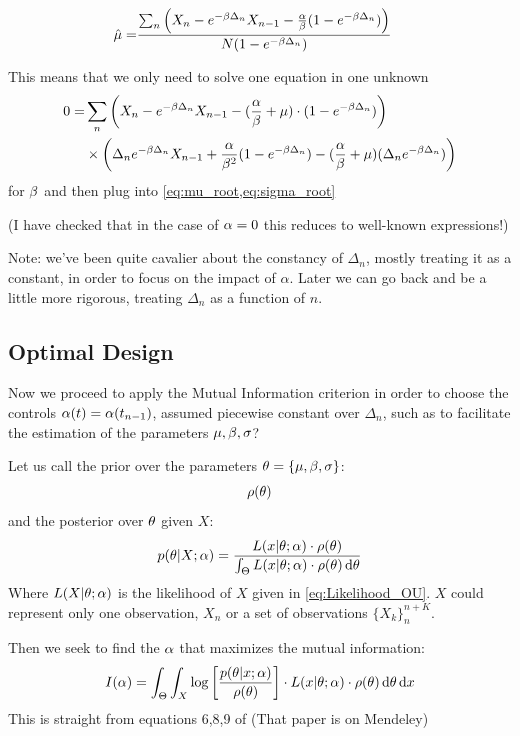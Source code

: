 \begin{align}
\hat{{\mu }} =&  \frac{ \sum_n \left( X_n - e^{-\beta \Delta_n} X_{n-1} -
	\frac{\alpha}{\beta} ( 1-e^{-\beta \Delta_n}) \right)}
	{N ( 1-e^{-\beta \Delta_n})}
	\label{eq:mu_root}
\end{align}

This means that we only need to solve one equation in one unknown
\begin{align}
\label{eq:beta_root}
0=& \sum_n \left( X_n - e^{-\beta \Delta_n} X_{n-1} -
  (\frac {{\alpha}}{{\beta}} + {\mu }) \cdot ( 1-e^{-\beta \Delta_n})  \right) 
  \\ \notag 
  & \times \left( \Delta_n e^{- \beta \Delta_n}X_{n-1} 
  							  + \frac{ \alpha } {\beta^2} (1-e^{-\beta \Delta_n}) 
  					 		  - (\frac {{\alpha}}{{\beta}} + {\mu }) ( \Delta_n e^{- \beta \Delta_n})          
  					 		  \right)
\end{align}
for $\beta$ and then plug into \cref{eq:mu_root,eq:sigma_root}

(I have checked that in the case of $\alpha=0$ this reduces to well-known
expressions!)

Note: we've been quite cavalier about the constancy of $\Delta_n$, mostly
treating it as a constant, in order to focus on the impact of $\alpha$. Later we
can go back and be a little more rigorous, treating $\Delta_n$ as a function of
$n$.
%  

\subsection{Optimal Design}
Now we proceed to apply the Mutual Information criterion in order to choose the
controls $\alpha(t) = \alpha(t_{n-1})$, assumed piecewise constant over $\Delta_n$, such
as to facilitate the estimation of the parameters ${\mu },\beta,\sigma$?
   
Let us call the prior over the parameters ${ \theta} = \{{\mu }, \beta, \sigma\}$:
$$\rho({ \theta})$$
and the posterior over ${ \theta}$ given $X$:
\begin{equation}
p({ \theta}| X; \alpha) =
\frac{L(x|{ \theta}; \alpha)\cdot \rho({ \theta})}{\int_\Theta L(x|{ \theta}; \alpha)\cdot \rho({ \theta})
\, \mathrm{d} { \theta}}
\label{eq:parameter_posterior_defn}
\end{equation} 
Where $ L(X|{ \theta}; \alpha)$ is the likelihood of $X$ given in
\cref{eq:Likelihood_OU}. $X$ could represent only one observation, $X_n$ or a
set of observations $\{X_k\}_n^{n+K}$.

Then we seek to find the $\alpha$ that maximizes the
mutual information:
\begin{equation}
I(\alpha) = \int_\Theta \int_X  \log\left[\frac{p({ \theta}| x; \alpha)}{\rho({ \theta})}\right]
\cdot L(x| { \theta};\alpha) \cdot \rho({ \theta}) \, \mathrm{d} { \theta} \, \mathrm{d} x
\label{eq:mutual_info_objective}
\end{equation}
This is straight from equations 6,8,9 of \cite{Myung2013} (That paper is on
Mendeley)
 
